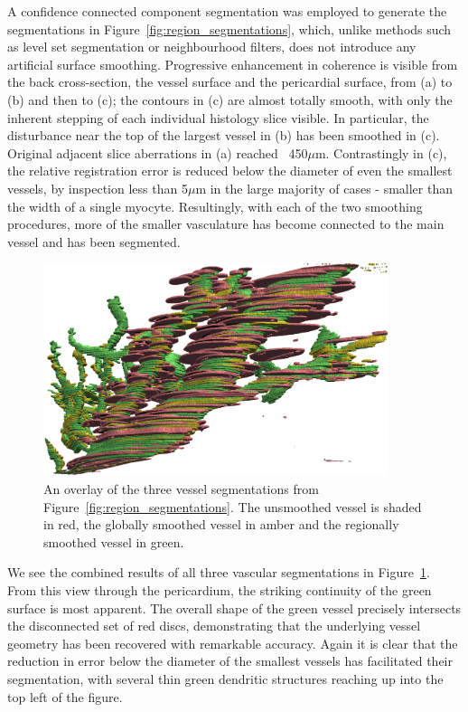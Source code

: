      A confidence connected component segmentation \cite{ITKGuide} was employed to generate the segmentations in Figure~\ref{fig:region_segmentations}, which, unlike methods such as level set segmentation or neighbourhood filters, does not introduce any artificial surface smoothing. Progressive enhancement in coherence is visible from the back cross-section, the vessel surface and the pericardial surface, from (a) to (b) and then to (c); the contours in (c) are almost totally smooth, with only the inherent stepping of each individual histology slice visible. In particular, the disturbance near the top of the largest vessel in (b) has been smoothed in (c). Original adjacent slice aberrations in (a) reached ~450$\mu$m. Contrastingly in (c), the relative registration error is reduced below the diameter of even the smallest vessels, by inspection less than 5$\mu$m in the large majority of cases - smaller than the width of a single myocyte. Resultingly, with each of the two smoothing procedures, more of the smaller vasculature has become connected to the main vessel and has been segmented.
    
    \begin{figure}
      \centering
      \includegraphics[width=0.9\textwidth]{Ch6/Figs/bottom_vessels/vessel_overlay}
      \caption{An overlay of the three vessel segmentations from Figure~\ref{fig:region_segmentations}. The unsmoothed vessel is shaded in red, the globally smoothed vessel in amber and the regionally smoothed vessel in green. }
      \label{fig:vessel_segmentations}
    \end{figure}
    
    We see the combined results of all three vascular segmentations in Figure~\ref{fig:vessel_segmentations}. From this view through the pericardium, the striking continuity of the green surface is most apparent. The overall shape of the green vessel precisely intersects the disconnected set of red discs, demonstrating that the underlying vessel geometry has been recovered with remarkable accuracy. Again it is clear that the reduction in error below the diameter of the smallest vessels has facilitated their segmentation, with several thin green dendritic structures reaching up into the top left of the figure.

